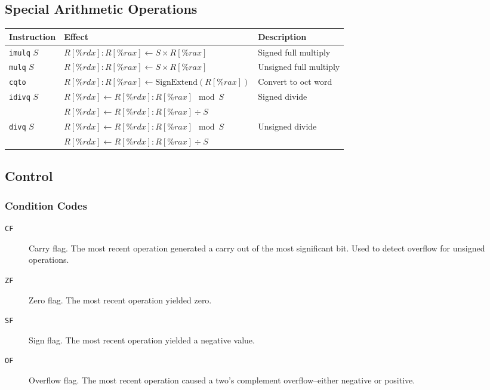 \documentclass[10pt]{armath}
\newcommand{\s}[1]{\texttt{#1}}
\begin{document}
\subsection{Special Arithmetic Operations}%
\label{sub:special_arithmetic_operations}

\begin{center}
  \begin{tabular}{l l l}
    \hline
    Instruction & Effect & Description\\
    \hline
    \hline
    \s{imulq} $S$ & $R[\%rdx]:R[\%rax]\leftarrow S\times R[\%rax]$ & Signed
    full multiply\\
    \s{mulq} $S$ & $R[\%rdx]:R[\%rax]\leftarrow S\times R[\%rax]$ &Unsigned
    full multiply\\
    \s{cqto} & $R[\%rdx]:R[\%rax]\leftarrow \text{SignExtend}(R[\%rax])$ &
    Convert to oct word\\
    \s{idivq} $S$ & $R[\%rdx]\leftarrow R[\%rdx]:R[\%rax]\mod S$ & Signed
    divide\\
                  & $R[\%rdx]\leftarrow R[\%rdx]:R[\%rax]\div S$ & \\
    \s{divq} $S$ & $R[\%rdx]\leftarrow R[\%rdx]:R[\%rax]\mod S$ &Unsigned
    divide\\
                 & $R[\%rdx]\leftarrow R[\%rdx]:R[\%rax]\div S$ & \\
                 \hline
  \end{tabular}
\end{center}

\subsection{Control}%
\label{sub:control}

\subsubsection{Condition Codes}%
\label{ssub:condition_codes}

\begin{description}
  \item[\s{CF}] Carry flag. The most recent operation generated a carry out of
    the most significant bit. Used to detect overflow for unsigned operations.
  \item[\s{ZF}] Zero flag. The most recent operation yielded zero.
  \item[\s{SF}] Sign flag. The most recent operation yielded a negative value.
  \item[\s{OF}] Overflow flag. The most recent operation caused a two's
    complement overflow--either negative or positive.
\end{description}
\end{document}
